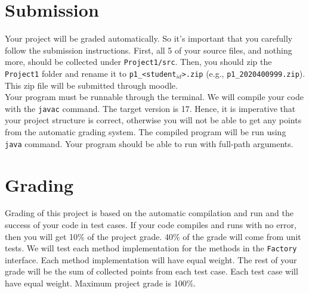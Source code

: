 \documentclass[10pt]{article}
\begin{document}
\section{Submission}

Your project will be graded automatically. So it's important that you carefully follow the submission instructions. First, all 5 of your source files, and nothing more, should be collected under \verb|Project1/src|. Then, you should zip the \verb|Project1| folder and rename it to \texttt{p1\_<student$_{id}$>.zip} (e.g., \verb|p1_2020400999.zip|). This zip file will be submitted through moodle. \\

Your program must be runnable through the terminal. We will compile your code with the \texttt{javac} command. The target version is 17. Hence, it is imperative that your project structure is correct, otherwise you will not be able to get any points from the automatic grading system.  The compiled program will be run using \texttt{java} command. Your program should be able to run with full-path arguments.

\section{Grading}

Grading of this project is based on the automatic compilation and run and the success of your code in test cases. If your code compiles and runs with no error, then you will get 10\% of the project grade. 40\% of the grade will come from unit tests. We will test each method implementation for the methods in the \texttt{Factory} interface. Each method implementation will have equal weight. The rest of your grade will be the sum of collected points from each test case. Each test case will have equal weight. Maximum project grade is 100\%.


\iffalse

P
RF
RL
AF 3 9
A 0 2 4
AL 5 25
A 0 1 1
A 3 4 16
AL 6 36
AF 7 30
P



F 3
F 20
U 4 9
U 13 21
G 0
G 17
U 1 36
A 21 21 21
P
FD
P
R
RP 9
RP 13
RL
RI 2
RF
RI 4

\fi
\end{document}
